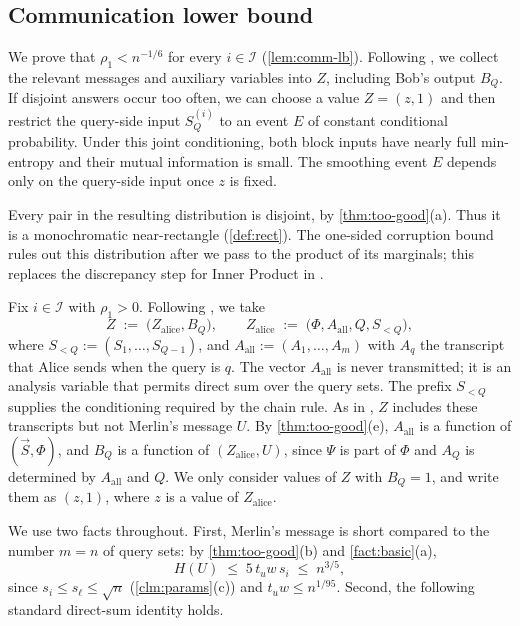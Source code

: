 \documentclass[11pt]{article}
\theoremstyle{plain}
\theoremstyle{definition}
\theoremstyle{remark}
\newcommand{\cI}{\mathcal{I}}
\newcommand{\vS}{\vec{S}}
\newcommand{\Aall}{A_{\mathrm{all}}}
\begin{document}
\subsection{Communication lower bound}\label{sec:step2}

We prove that $\rho_1<n^{-1/6}$ for every $i\in\cI$ (\cref{lem:comm-lb}). Following \cite{ko_omega_2026,ko_adaptive_2020}, we collect the relevant messages and auxiliary variables into $Z$, including Bob's output $B_Q$. If disjoint answers occur too often, we can choose a value $Z=(z,1)$ and then restrict the query-side input $S_Q^{(i)}$ to an event $E$ of constant conditional probability. Under this joint conditioning, both block inputs have nearly full min-entropy and their mutual information is small. The smoothing event $E$ depends only on the query-side input once $z$ is fixed.

Every pair in the resulting distribution is disjoint, by \cref{thm:too-good}(a). Thus it is a monochromatic near-rectangle (\cref{def:rect}). The one-sided corruption bound rules out this distribution after we pass to the product of its marginals; this replaces the discrepancy step for Inner Product in \cite{ko_omega_2026}.

Fix $i \in \cI$ with $\rho_1 > 0$. Following \cite{ko_omega_2026}, we take
\[ Z \;:=\; \big(Z_{\mathrm{alice}}, B_Q\big), \qquad Z_{\mathrm{alice}} \;:=\; \big(\Phi, \Aall, Q, S_{<Q}\big), \]
where $S_{<Q} := (S_1, \dots, S_{Q-1})$, and $\Aall := (A_1, \dots, A_m)$ with $A_q$ the transcript that Alice sends when the query is $q$. The vector $\Aall$ is never transmitted; it is an analysis variable that permits direct sum over the query sets. The prefix $S_{<Q}$ supplies the conditioning required by the chain rule. As in \cite{ko_omega_2026}, $Z$ includes these transcripts but not Merlin's message $U$. By \cref{thm:too-good}(e), $\Aall$ is a function of $(\vS, \Phi)$, and $B_Q$ is a function of $(Z_{\mathrm{alice}}, U)$, since $\Psi$ is part of $\Phi$ and $A_Q$ is determined by $\Aall$ and $Q$. We only consider values of $Z$ with $B_Q = 1$, and write them as $(z, 1)$, where $z$ is a value of $Z_{\mathrm{alice}}$.

We use two facts throughout. First, Merlin's message is short compared to the number $m = n$ of query sets: by \cref{thm:too-good}(b) and \cref{fact:basic}(a),
\begin{equation}\label{eq:HU}
H(U) \;\le\; 5\, t_u w\, s_i \;\le\; n^{3/5},
\end{equation}
since $s_i \le s_\ell \le \sqrt n$ (\cref{clm:params}(c)) and $t_u w \le n^{1/95}$. Second, the following standard direct-sum identity holds.
\end{document}

